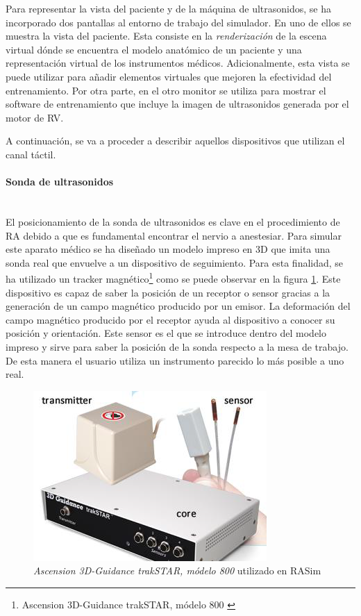 Para representar la vista del paciente y de la máquina de ultrasonidos, se ha incorporado dos pantallas al entorno de trabajo del simulador. 
En uno de ellos se muestra la vista del paciente. Esta consiste en la \emph{renderización} de la escena virtual dónde se encuentra el modelo anatómico de un paciente y una representación virtual de los instrumentos médicos. Adicionalmente, esta vista se puede utilizar para añadir elementos virtuales que mejoren la efectividad del entrenamiento. 
Por otra parte, en el otro monitor se utiliza para mostrar el software de entrenamiento que incluye la imagen de ultrasonidos generada por el motor de \ac{RV}.

A continuación, se va a proceder a describir aquellos dispositivos que utilizan el canal táctil. 

\paragraph{Sonda de ultrasonidos}\mbox{}\\

El posicionamiento de la sonda de ultrasonidos es clave en el procedimiento de \ac{RA} debido a que es fundamental encontrar el nervio a anestesiar. Para simular este aparato médico se ha diseñado un modelo impreso en 3D que imita una sonda real que envuelve a un dispositivo de seguimiento. Para esta finalidad, se ha utilizado un \ac{tracker} magnético\footnote{ Ascension 3D-Guidance trakSTAR, módelo 800 \cite{Ascension}} como se puede observar en la figura \ref{fig:tracker}. 
Este dispositivo es capaz de saber la posición de un receptor o sensor gracias a la generación de un campo magnético producido por un emisor. La deformación del campo magnético producido por el receptor ayuda al dispositivo a conocer su posición y orientación. Este sensor es el que se introduce dentro del modelo impreso y sirve para saber la posición de la sonda respecto a la mesa de trabajo. De esta manera el usuario utiliza un instrumento parecido lo más posible a uno real.

\begin{figure}[h]
    \centering
    \includegraphics{IMG/tracker.png}
    \caption{\emph{Ascension 3D-Guidance trakSTAR, módelo 800} \cite{Ascension} utilizado en \ac{RASim}}
    \label{fig:tracker}
\end{figure}

